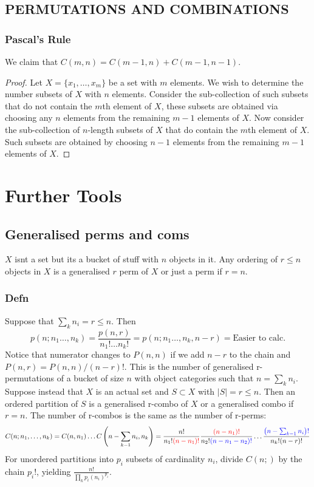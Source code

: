 \subsection{PERMUTATIONS
AND COMBINATIONS}
\subsubsection*{Pascal's Rule}
We claim that $C(m,n) = C(m-1,n)+C(m-1,n-1)$.
\begin{proof}
Let $X = \{x_1,\hdots,x_m\}$ be a set with $m$ elements.
We wish to determine the number subsets of $X$ with $n$ elements.
Consider the sub-collection of such subsets that
do not contain the $m$th element of $X$,
these subsets are obtained via choosing any $n$ elements
from the remaining $m-1$ elements of $X$. Now consider the sub-collection
of $n$-length subsets of $X$
that do contain the $m$th element of $X$.
Such subsets are obtained by choosing $n-1$ elements from
the remaining $m-1$ elements of $X$.
\end{proof}
\section{Further Tools}
\subsection{Generalised perms and coms}
$X$ isnt a set but its a bucket of stuff with $n$ objects in it.
Any ordering of $r \leq n$ objects in $X$ is a generalised $r$ perm of $X$ or just a perm if $r = n$.
\subsubsection*{Defn}
Suppose that $\sum_k n_i = r \leq n$.  Then
$$
p(n; n_1 \hdots,n_k) =  \frac{p(n,r)}{n_1! \hdots n_k!} = p(n; n_1 \hdots,n_k, n-r) = \text{Easier to calc}.
$$
Notice that numerator changes to $P(n,n)$ if we add $n-r$ to the chain
and $P(n,r) = P(n,n) \slash (n-r)!$. This is the number of generalised r-permutations of a bucket of size $n$ with object categories such that $n = \sum_k n_i$.\\
\newline Suppose instead that $X$ is an actual set and $S \subset X$ with $|S| = r \leq n$.
Then an ordered partition of $S$ is a generalised r-combo of $X$ or a generalised combo if $r = n$.
The number of r-combos is the same as the number of r-perms:
$$C(n;n_1,\hdots,n_k) = C(n,n_1) \hdots C \left(n - \sum_{k-1} n_i,n_k \right) = \frac{n!}{n_1!\color{red}{(n-n_1)!}} \frac{\color{red}{(n-n_1)!}}{n_2!\color{blue}{(n-n_1-n_2)!}} \hdots \frac{\color{red}{\color{blue}{\left(n-\sum_{k-1} n_i \right)!}}}{n_k!(n-r)!}$$
For unordered partitions into $p_i$ subsets of cardinality $n_i$,
divide $C(n;)$ by the chain $p_i!$, yielding $
\frac{n!}{\prod_k p_i(n_i)^{p_i}}.
$
